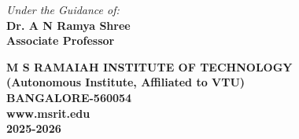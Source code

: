 \begin{titlepage}
\centering
\textit{Under the Guidance of:}\\

\bf{Dr. A N Ramya Shree}
 \\ Associate Professor \\ 
\vspace{12mm}
 \begin{center}
 
     \linespread{0.3}
    \Large\bf{M S RAMAIAH INSTITUTE OF TECHNOLOGY}\\
    \vspace{2mm}
    \normalfont(Autonomous Institute, Affiliated to VTU)\\
    \vspace{2mm}
BANGALORE-560054\\
\vspace{2mm}
www.msrit.edu\\
\vspace{2mm}
2025-2026\\
\end{center}
\end{titlepage}	
